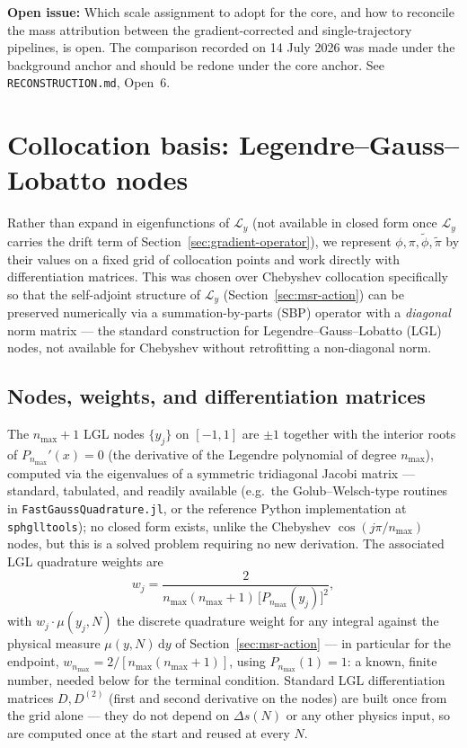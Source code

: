 \documentclass[a4paper,11pt]{article}
\renewcommand{\d}{\mathrm{d}}
\newenvironment{todo}{\begin{tcolorbox}[enhanced,breakable,colback=SussexBurntOrange!10,colframe=SussexBurntOrange!40]\small{\textsf{\textbf{Open issue:} }}}{\end{tcolorbox}}
\newcommand{\Ny}{N}                          %
\newcommand{\field}{\phi}                    %
\newcommand{\mom}{\pi}                       %
\newcommand{\rfield}{\widetilde\field}       %
\newcommand{\rmom}{\widetilde\mom}           %
\newcommand{\yco}{y}                         %
\newcommand{\Deltas}{\Delta s}                %
\newcommand{\measure}{\mu}                   %
\newcommand{\Lop}{\mathcal{L}_\yco}          %
\newcommand{\modeidx}{n}                     %
\begin{document}
\begin{todo}
Which scale assignment to adopt for the core, and how to reconcile the
mass attribution between the gradient-corrected and single-trajectory
pipelines, is open. The comparison recorded on 14 July 2026 was made under
the background anchor and should be redone under the core anchor. See
\texttt{RECONSTRUCTION.md}, Open~6.
\end{todo}
\section{Collocation basis: Legendre--Gauss--Lobatto nodes}
\label{sec:collocation-basis}

Rather than expand in eigenfunctions of $\Lop$ (not available in closed
form once $\Lop$ carries the drift term of Section~\ref{sec:gradient-operator}),
we
represent $\field,\mom,\rfield,\rmom$ by their values on a fixed grid of
collocation points and work directly with differentiation matrices. This
was chosen over Chebyshev collocation specifically so that the
self-adjoint structure of $\Lop$ (Section~\ref{sec:msr-action}) can be
preserved numerically via a summation-by-parts (SBP) operator with a
\emph{diagonal} norm matrix --- the standard construction for
Legendre--Gauss--Lobatto (LGL) nodes, not available for Chebyshev without
retrofitting a non-diagonal norm.

\subsection{Nodes, weights, and differentiation matrices}

The $\modeidx_{\max}+1$ LGL nodes $\{\yco_j\}$ on $[-1,1]$ are $\pm1$
together with the interior roots of $P_{\modeidx_{\max}}'(x)=0$ (the
derivative of the Legendre polynomial of degree $\modeidx_{\max}$),
computed via the eigenvalues of a symmetric tridiagonal Jacobi matrix ---
standard, tabulated, and readily available (e.g.\ the Golub--Welsch-type
routines in \texttt{FastGaussQuadrature.jl}, or the reference Python
implementation at \texttt{sphglltools}); no closed form exists, unlike the
Chebyshev $\cos(j\pi/\modeidx_{\max})$ nodes, but this is a solved problem
requiring no new derivation. The associated LGL quadrature weights are
\begin{equation}
    w_j = \frac{2}{\modeidx_{\max}(\modeidx_{\max}+1)\,\big[P_{\modeidx_{\max}}(\yco_j)\big]^2} ,
    \label{eq:lgl-weights}
\end{equation}
with $w_j\cdot\measure(\yco_j,\Ny)$ the discrete quadrature weight for any
integral against the physical measure $\measure(\yco,\Ny)\,\d\yco$ of
Section~\ref{sec:msr-action} --- in particular for the endpoint,
$w_{\modeidx_{\max}} = 2/[\modeidx_{\max}(\modeidx_{\max}+1)]$, using
$P_{\modeidx_{\max}}(1)=1$: a known, finite number, needed below for the
terminal condition. Standard LGL differentiation matrices $D,D^{(2)}$
(first and second derivative on the nodes) are built once from the grid
alone --- they do not depend on $\Deltas(\Ny)$ or any other physics input,
so are computed once at the start and reused at every $\Ny$.
\end{document}
